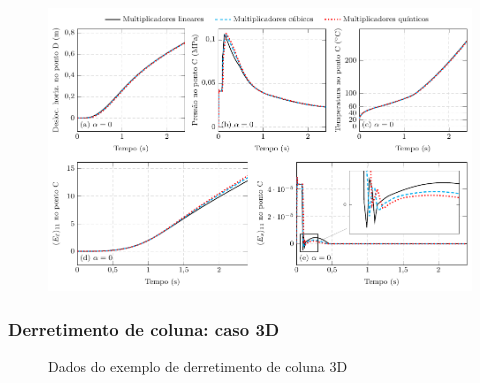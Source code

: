 \documentclass[Tese.tex]{subfiles}
\begin{document}
\begin{figure}[!htb]
	\centering
	\caption{}
	\label{fig:PhaseChangeDamSolidToLiquid-multipliers-a0}
	\includegraphics[scale=1.0]{Figuras/PhaseChangeDam/PhaseChangeDamSolidToLiquid-multipliers-a0.pdf}
\end{figure}

\subsubsection{Derretimento de coluna: caso 3D}

\begin{figure}[!htb]
	\centering
	\caption{Dados do exemplo de derretimento de coluna 3D}
	\label{fig:PhaseChangeDam3D}
	{\small
		\noindent{}
	}	
\end{figure}
\end{document}
